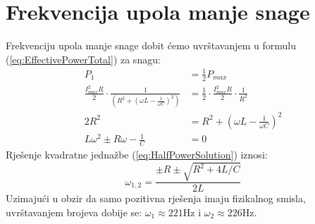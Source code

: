 \documentclass{article}
\let\oldref\ref
\renewcommand{\ref}[1]{(\oldref{#1})}
\begin{document}
\section*{Frekvencija upola manje snage}
Frekvenciju upola manje snage dobit ćemo uvrštavanjem u formulu \ref{eq:EffectivePowerTotal} za snagu:
\begin{align}
  P_{1}                                                                                                  & = \frac{1}{2}P_{max}                                                      \\
  \frac{I_{max}^2R}{2} \cdot \frac{1}{\left(R^2 + (\omega L - \frac{1}{\omega C})^2\right)} & = \frac{1}{2} \cdot \frac{I_{max}^2R}{2} \cdot \frac{1}{R^2} \\
  2R^2                                                                                                   & = R^2 + \left(\omega L - \frac{1}{\omega C}\right)^2                      \\
  \label{eq:HalfPowerSolution}
  L\omega^2 \pm R\omega - \frac{1}{C}                                                                    & = 0
\end{align}
Rješenje kvadratne jednažbe \ref{eq:HalfPowerSolution} iznosi:
\begin{equation}
  \omega_{1,2} = \frac{\pm R \pm \sqrt{R^2 + 4L/C}}{2L}
\end{equation}
Uzimajući u obzir da samo pozitivna rješenja imaju fizikalnog smisla, uvrštavanjem brojeva dobije se: $\omega_1 \approx 221\text{Hz}$ i $\omega_2 \approx 226\text{Hz}$.
\end{document}
